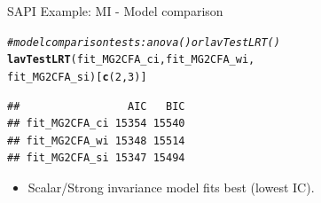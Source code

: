 \documentclass[10pt]{beamer}\usepackage[]{graphicx}\usepackage[]{xcolor}
\makeatletter
\newcommand{\hlnum}[1]{\textcolor[rgb]{0.686,0.059,0.569}{#1}}%
\newcommand{\hlcom}[1]{\textcolor[rgb]{0.678,0.584,0.686}{\textit{#1}}}%
\newcommand{\hlstd}[1]{\textcolor[rgb]{0.345,0.345,0.345}{#1}}%
\newcommand{\hlkwd}[1]{\textcolor[rgb]{0.737,0.353,0.396}{\textbf{#1}}}%
\newenvironment{kframe}{%
 \def\at@end@of@kframe{}%
 \ifinner\ifhmode%
  \def\at@end@of@kframe{\end{minipage}}%
  \begin{minipage}{\columnwidth}%
 \fi\fi%
 \def\FrameCommand##1{\hskip\@totalleftmargin \hskip-\fboxsep
 \colorbox{shadecolor}{##1}\hskip-\fboxsep
     \hskip-\linewidth \hskip-\@totalleftmargin \hskip\columnwidth}%
 \MakeFramed {\advance\hsize-\width
   \@totalleftmargin\z@ \linewidth\hsize
   \@setminipage}}%
 {\par\unskip\endMakeFramed%
 \at@end@of@kframe}
\newenvironment{knitrout}{}{} %
\makeatother
\begin{document}
%
\begin{frame}[fragile]{SAPI Example: MI - Model comparison}

\begin{knitrout}
\color{fgcolor}\begin{kframe}
\begin{alltt}
\hlcom{# model comparison tests: anova() or lavTestLRT()}
\hlkwd{lavTestLRT}\hlstd{(fit_MG2CFA_ci, fit_MG2CFA_wi,}
           \hlstd{fit_MG2CFA_si)[}\hlkwd{c}\hlstd{(}\hlnum{2}\hlstd{,}\hlnum{3}\hlstd{)]}
\end{alltt}
\begin{verbatim}
##                 AIC   BIC
## fit_MG2CFA_ci 15354 15540
## fit_MG2CFA_wi 15348 15514
## fit_MG2CFA_si 15347 15494
\end{verbatim}
\end{kframe}
\end{knitrout}

\begin{itemize}
    \item Scalar/Strong invariance model fits best (lowest IC).
\end{itemize}

\end{frame}
%
\end{document}
